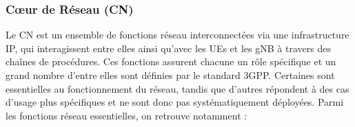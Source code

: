 \documentclass[a4paper,11pt,twoside]{StyleThese}
\begin{document}





\subsubsection{Cœur de Réseau (CN)}
Le CN est un ensemble de fonctions réseau interconnectées via une infrastructure IP, qui interagissent entre elles ainsi qu’avec les UEs et les gNB à travers des chaînes de procédures. Ces fonctions assurent chacune un rôle spécifique et un grand nombre d'entre elles sont définies par le standard 3GPP. Certaines sont essentielles au fonctionnement du réseau, tandis que d’autres répondent à des cas d’usage plus spécifiques et ne sont donc pas systématiquement déployées. Parmi les fonctions réseau essentielles, on retrouve notamment :
\end{document}
